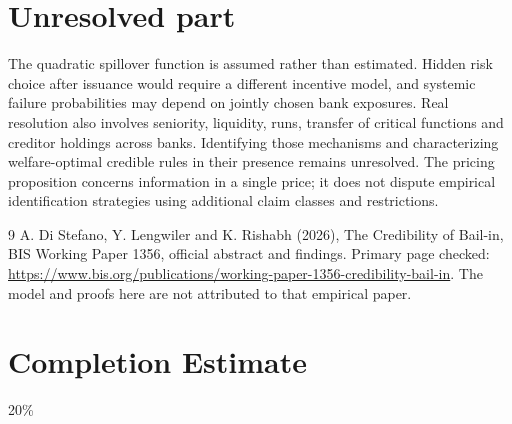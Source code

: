 \documentclass[11pt]{article}
\theoremstyle{definition}
\begin{document}
\section*{Unresolved part}
The quadratic spillover function is assumed rather than estimated. Hidden risk choice after issuance would require a different incentive model, and systemic failure probabilities may depend on jointly chosen bank exposures. Real resolution also involves seniority, liquidity, runs, transfer of critical functions and creditor holdings across banks. Identifying those mechanisms and characterizing welfare-optimal credible rules in their presence remains unresolved. The pricing proposition concerns information in a single price; it does not dispute empirical identification strategies using additional claim classes and restrictions.
\begin{thebibliography}{9}
 A. Di Stefano, Y. Lengwiler and K. Rishabh (2026), The Credibility of Bail-in, BIS Working Paper 1356, official abstract and findings. Primary page checked: \url{https://www.bis.org/publications/working-paper-1356-credibility-bail-in}. The model and proofs here are not attributed to that empirical paper.
\end{thebibliography}

\section{Completion Estimate}
20\%
\end{document}
